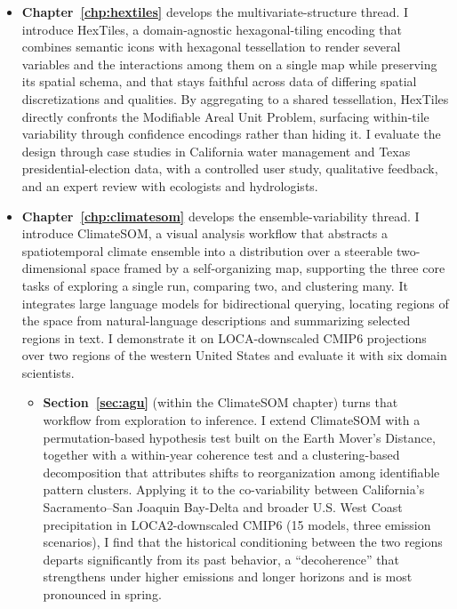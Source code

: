 \begin{itemize}[topsep=2pt, leftmargin=*]
    \item \textbf{Chapter~\ref{chp:hextiles}} develops the multivariate-structure thread. I introduce HexTiles, a domain-agnostic hexagonal-tiling encoding that combines semantic icons with hexagonal tessellation to render several variables and the interactions among them on a single map while preserving its spatial schema, and that stays faithful across data of differing spatial discretizations and qualities. By aggregating to a shared tessellation, HexTiles directly confronts the
        Modifiable Areal Unit Problem, surfacing within-tile variability through confidence encodings rather than hiding it. I evaluate the design through case studies in California water management and Texas presidential-election data, with a controlled user study, qualitative feedback, and an expert review with ecologists and hydrologists.
    \item \textbf{Chapter~\ref{chp:climatesom}} develops the ensemble-variability thread. I introduce ClimateSOM, a visual analysis workflow that abstracts a spatiotemporal climate ensemble into a distribution over a steerable two-dimensional space framed by a self-organizing map, supporting the three core tasks of exploring a single run, comparing two, and clustering many. It integrates large language models for bidirectional querying, locating regions of the space from natural-language descriptions and summarizing selected regions in text. I demonstrate it on LOCA-downscaled CMIP6 projections over two regions of the western United States and evaluate it with six domain scientists.
        \begin{itemize}
    \item \textbf{Section~\ref{sec:agu}} (within the ClimateSOM chapter) turns that workflow from exploration to inference. I extend ClimateSOM with a permutation-based hypothesis test built on the Earth Mover's Distance, together with a within-year coherence test and a clustering-based decomposition that attributes shifts to reorganization among identifiable pattern clusters. Applying it to the co-variability between California's Sacramento--San Joaquin Bay-Delta and broader U.S. West Coast
        precipitation in LOCA2-downscaled CMIP6 (15 models, three emission scenarios), I find that the historical conditioning between the two regions departs significantly from its past behavior, a ``decoherence'' that strengthens under higher emissions and longer horizons and is most pronounced in spring.
        \end{itemize}

\end{itemize}
